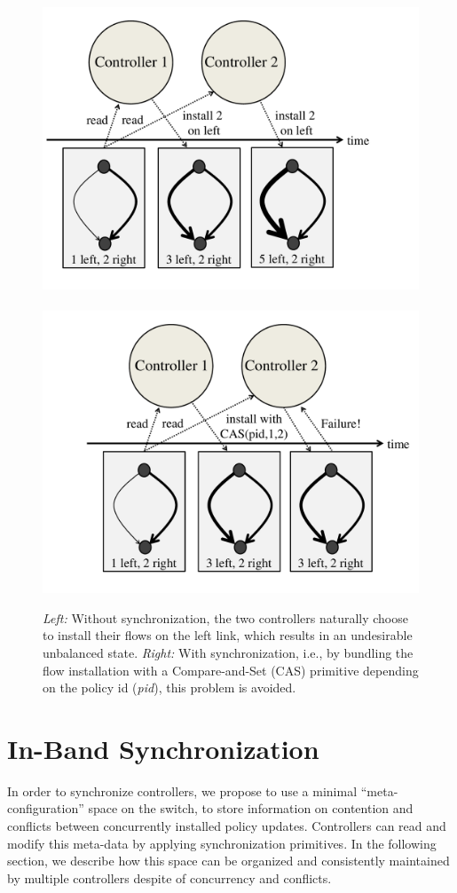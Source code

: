 \documentclass[conference]{sigcomm-alternate}
\begin{document}
\begin{figure}[t]
\centering
\includegraphics[width=.56\columnwidth]{loadbal-1.pdf}~\hspace{-.7cm}~\includegraphics[width=.56\columnwidth]{loadbal-2.pdf}\\
\caption{\emph{Left:} Without synchronization, the two controllers naturally choose to
install their flows on the left link, which results in an undesirable
unbalanced state.
 \emph{Right:}
 With synchronization, i.e., by bundling the flow installation with a Compare-and-Set (CAS) primitive
 depending on the policy id (\emph{pid}), this problem is avoided.}\label{fig:CAS-example}
\end{figure}

\section{In-Band Synchronization}\label{sec:main}

In order to synchronize controllers, we propose
to use a minimal
``meta-configuration'' space on the switch,
to store information
on contention and conflicts between
concurrently installed policy updates. Controllers can read and modify
this meta-data by applying synchronization primitives.
In the following section, we
describe how this space can be organized and consistently maintained
by multiple controllers despite of concurrency and conflicts.
\end{document}
